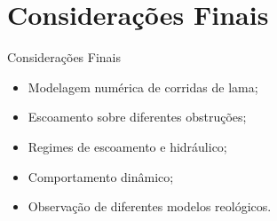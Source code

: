 \section{Considerações Finais}

\begin{frame}
    \begin{exampleblock}{Considerações Finais}
        \begin{itemize}
            \item Modelagem numérica de corridas de lama;
            \item Escoamento sobre diferentes obstruções;
            \item Regimes de escoamento e hidráulico;
            \item Comportamento dinâmico;
            \item Observação de diferentes modelos reológicos.
        \end{itemize}        
    \end{exampleblock}
\end{frame}
